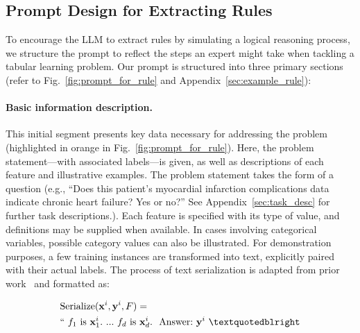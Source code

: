 \subsection{Prompt Design for Extracting Rules}
\label{Sec:prompt_design}
To encourage the LLM to extract rules by simulating a logical reasoning process, we structure the prompt to reflect the steps an expert might take when tackling a tabular learning problem. Our prompt is structured into three primary sections (refer to Fig.~\ref{fig:prompt_for_rule} and Appendix~\ref{sec:example_rule}):

\vspace*{-0.12in}
\paragraph{Basic information description.} This initial segment presents key data necessary for addressing the problem (highlighted in orange in Fig.~\ref{fig:prompt_for_rule}). Here, the problem statement—with associated labels—is given, as well as descriptions of each feature and illustrative examples. The problem statement takes the form of a question (e.g., ``Does this patient's myocardial infarction complications data indicate chronic heart failure? Yes or no?'' See Appendix~\ref{sec:task_desc} for further task descriptions.). Each feature is specified with its type of value, and definitions may be supplied when available. In cases involving categorical variables, possible category values can also be illustrated. For demonstration purposes, a few training instances are transformed into text, explicitly paired with their actual labels. The process of text serialization is adapted from prior work~\cite{dinh2022lift,hegselmann2023tabllm} and formatted as:

\begin{align}
&\text{Serialize}(\mathbf{x}^i,\mathbf{y}^i, F) = \nonumber \\
&``\ f_1\ \text{is}\ \mathbf{x}^i_1.\ ... \ f_d\  \text{is}\  \mathbf{x}^i_d.\ \ \text{Answer:}\  \mathbf{y}^i\ ”
\end{align}

\vspace*{-0.12in}
